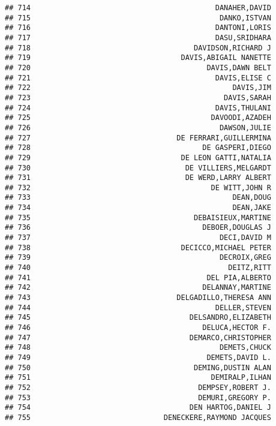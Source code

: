 \documentclass[
]{article}
\begin{document}
\begin{verbatim}
## 714                                           DANAHER,DAVID
## 715                                            DANKO,ISTVAN
## 716                                           DANTONI,LORIS
## 717                                           DASU,SRIDHARA
## 718                                      DAVIDSON,RICHARD J
## 719                                   DAVIS,ABIGAIL NANETTE
## 720                                         DAVIS,DAWN BELT
## 721                                           DAVIS,ELISE C
## 722                                               DAVIS,JIM
## 723                                             DAVIS,SARAH
## 724                                           DAVIS,THULANI
## 725                                          DAVOODI,AZADEH
## 726                                            DAWSON,JULIE
## 727                                  DE FERRARI,GUILLERMINA
## 728                                        DE GASPERI,DIEGO
## 729                                   DE LEON GATTI,NATALIA
## 730                                    DE VILLIERS,MELGARDT
## 731                                    DE WERD,LARRY ALBERT
## 732                                          DE WITT,JOHN R
## 733                                               DEAN,DOUG
## 734                                               DEAN,JAKE
## 735                                      DEBAISIEUX,MARTINE
## 736                                        DEBOER,DOUGLAS J
## 737                                            DECI,DAVID M
## 738                                   DECICCO,MICHAEL PETER
## 739                                            DECROIX,GREG
## 740                                              DEITZ,RITT
## 741                                         DEL PIA,ALBERTO
## 742                                        DELANNAY,MARTINE
## 743                                  DELGADILLO,THERESA ANN
## 744                                           DELLER,STEVEN
## 745                                     DELSANDRO,ELIZABETH
## 746                                        DELUCA,HECTOR F.
## 747                                     DEMARCO,CHRISTOPHER
## 748                                            DEMETS,CHUCK
## 749                                         DEMETS,DAVID L.
## 750                                      DEMING,DUSTIN ALAN
## 751                                          DEMIRALP,ILHAN
## 752                                       DEMPSEY,ROBERT J.
## 753                                       DEMURI,GREGORY P.
## 754                                     DEN HARTOG,DANIEL J
## 755                               DENECKERE,RAYMOND JACQUES

\end{verbatim}
\end{document}
